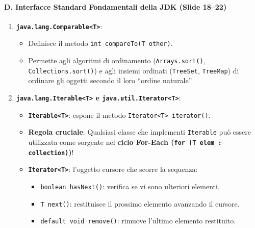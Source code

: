 \documentclass[11pt,a4paper]{article}
\newcommand{\passthrough}[1]{#1}
\providecommand{\tightlist}{\setlength{\itemsep}{0pt}\setlength{\parskip}{0pt}}
\begin{document}
\paragraph{D. Interfacce Standard Fondamentali della JDK (Slide
18--22)}\label{d.-interfacce-standard-fondamentali-della-jdk-slide-1822}

\begin{enumerate}
\def\labelenumi{\arabic{enumi}.}
\tightlist
\item
  \textbf{\passthrough{\lstinline!java.lang.Comparable<T>!}}:

  \begin{itemize}
  \tightlist
  \item
    Definisce il metodo
    \passthrough{\lstinline!int compareTo(T other)!}.
  \item
    Permette agli algoritmi di ordinamento
    (\passthrough{\lstinline!Arrays.sort()!},
    \passthrough{\lstinline!Collections.sort()!}) e agli insiemi
    ordinati (\passthrough{\lstinline!TreeSet!},
    \passthrough{\lstinline!TreeMap!}) di ordinare gli oggetti secondo
    il loro ``ordine naturale''.
  \end{itemize}
\item
  \textbf{\passthrough{\lstinline!java.lang.Iterable<T>!} e
  \passthrough{\lstinline!java.util.Iterator<T>!}}:

  \begin{itemize}
  \tightlist
  \item
    \textbf{\passthrough{\lstinline!Iterable<T>!}}: espone il metodo
    \passthrough{\lstinline!Iterator<T> iterator()!}.
  \item
    \textbf{Regola cruciale}: Qualsiasi classe che implementi
    \passthrough{\lstinline!Iterable!} può essere utilizzata come
    sorgente nel \textbf{ciclo For-Each
    (\passthrough{\lstinline!for (T elem : collection)!})}!
  \item
    \textbf{\passthrough{\lstinline!Iterator<T>!}}: l'oggetto cursore
    che scorre la sequenza:

    \begin{itemize}
    \tightlist
    \item
      \passthrough{\lstinline!boolean hasNext()!}: verifica se vi sono
      ulteriori elementi.
    \item
      \passthrough{\lstinline!T next()!}: restituisce il prossimo
      elemento avanzando il cursore.
    \item
      \passthrough{\lstinline!default void remove()!}: rimuove l'ultimo
      elemento restituito.
    \end{itemize}
  \end{itemize}
\end{enumerate}
\end{document}
